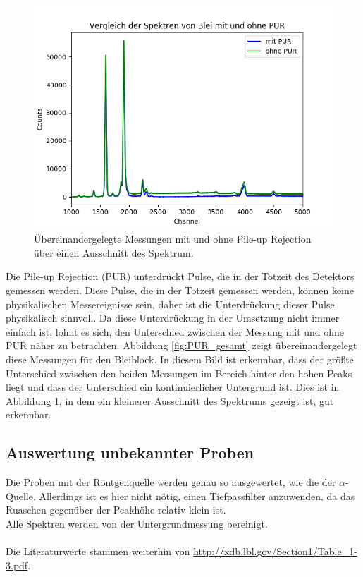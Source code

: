 \documentclass[12pt,a4paper]{article}
\begin{document}
\begin{figure}
\centering
\includegraphics[scale=0.8]{Bilder/roentgen/PUR/Ausschnitt.png}
\caption{Übereinandergelegte Messungen mit und ohne Pile-up Rejection über einen Ausschnitt des Spektrum.}
\label{fig:PUR_ausschnitt}
\end{figure}

Die Pile-up Rejection (PUR) unterdrückt Pulse, die in der Totzeit des Detektors gemessen werden. Diese Pulse, die in der Totzeit gemessen werden, können keine physikalischen Messereignisse sein, daher ist die Unterdrückung dieser Pulse physikalisch sinnvoll. Da diese Unterdrückung in der Umsetzung nicht immer einfach ist, lohnt es sich, den Unterschied zwischen der Messung mit und ohne PUR näher zu betrachten. Abbildung \ref{fig:PUR_gesamt} zeigt übereinandergelegt diese Messungen für den Bleiblock. In diesem Bild ist erkennbar, dass der größte Unterschied zwischen den beiden Messungen im Bereich hinter den hohen Peaks liegt und dass der Unterschied ein kontinuierlicher Untergrund ist. Dies ist in Abbildung \ref{fig:PUR_ausschnitt}, in dem ein kleinerer Ausschnitt des Spektrums gezeigt ist, gut erkennbar.

\subsection{Auswertung unbekannter Proben}
Die Proben mit der Röntgenquelle werden genau so ausgewertet, wie die der $\alpha$-Quelle. Allerdings ist es hier nicht nötig, einen Tiefpassfilter anzuwenden, da das Ruaschen gegenüber der Peakhöhe relativ klein ist.\\
Alle Spektren werden von der Untergrundmessung bereinigt.\\
\\
Die Literaturwerte stammen weiterhin von \url{http://xdb.lbl.gov/Section1/Table_1-3.pdf}.
\end{document}
